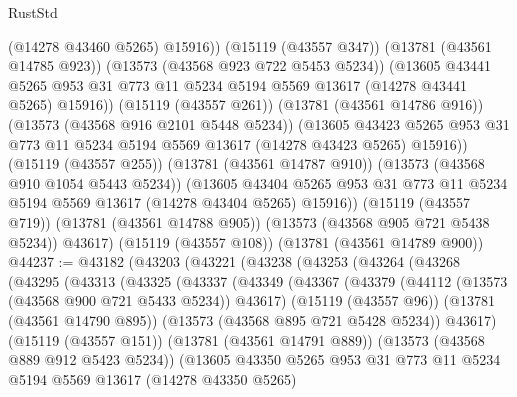 \begin{lexlean}{RustStd}
\begin{coremodule}
                (@14278 @43460 @5265)
                @15916))
            (@15119 (@43557 @347))
            (@13781 (@43561 @14785 @923))
            (@13573 (@43568 @923 @722 @5453 @5234))
            (@13605
              @43441
              @5265
              @953
              @31
              @773
              @11
              @5234
              @5194
              @5569
              @13617
              (@14278 @43441 @5265)
              @15916))
          (@15119 (@43557 @261))
          (@13781 (@43561 @14786 @916))
          (@13573 (@43568 @916 @2101 @5448 @5234))
          (@13605
            @43423
            @5265
            @953
            @31
            @773
            @11
            @5234
            @5194
            @5569
            @13617
            (@14278 @43423 @5265)
            @15916))
        (@15119 (@43557 @255))
        (@13781 (@43561 @14787 @910))
        (@13573 (@43568 @910 @1054 @5443 @5234))
        (@13605
          @43404
          @5265
          @953
          @31
          @773
          @11
          @5234
          @5194
          @5569
          @13617
          (@14278 @43404 @5265)
          @15916))
      (@15119 (@43557 @719))
      (@13781 (@43561 @14788 @905))
      (@13573 (@43568 @905 @721 @5438 @5234))
      @43617)
    (@15119 (@43557 @108))
    (@13781 (@43561 @14789 @900))
@44237 := @43182
    (@43203
      (@43221
        (@43238
          (@43253
            (@43264
              (@43268
                (@43295
                  (@43313
                    (@43325
                      (@43337
                        (@43349
                          (@43367
                            (@43379
                              (@44112 (@13573 (@43568 @900 @721 @5433 @5234)) @43617)
                              (@15119 (@43557 @96))
                              (@13781 (@43561 @14790 @895))
                              (@13573 (@43568 @895 @721 @5428 @5234))
                              @43617)
                            (@15119 (@43557 @151))
                            (@13781 (@43561 @14791 @889))
                            (@13573 (@43568 @889 @912 @5423 @5234))
                            (@13605
                              @43350
                              @5265
                              @953
                              @31
                              @773
                              @11
                              @5234
                              @5194
                              @5569
                              @13617
                              (@14278 @43350 @5265)

\end{coremodule}
\end{lexlean}
